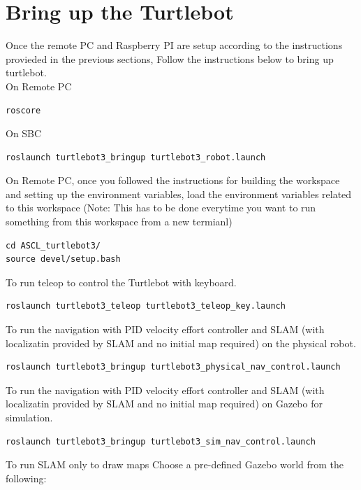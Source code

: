 \documentclass[12]{article}
\begin{document}
\newpage

\section{Bring up the Turtlebot}
Once the remote PC and Raspberry PI are setup according to the instructions provieded in the previous sections, 
Follow the instructions below to bring up turtlebot.  \\
On Remote PC
\begin{lstlisting}[style=bash]
    roscore
\end{lstlisting}
On SBC
\begin{lstlisting}[style=bash]
    roslaunch turtlebot3_bringup turtlebot3_robot.launch
\end{lstlisting}

On Remote PC, once you followed the instructions for building the workspace and setting up the environment variables,  
load the environment variables related to this workspace (Note: This has to be done everytime you want to run something from this workspace from a new termianl)
\begin{lstlisting}[style=bash]
cd ASCL_turtlebot3/
source devel/setup.bash
\end{lstlisting}

To run teleop to control the Turtlebot with keyboard.
\begin{lstlisting}[style=bash]
roslaunch turtlebot3_teleop turtlebot3_teleop_key.launch
\end{lstlisting}

To run the navigation with PID velocity effort controller and SLAM (with localizatin provided by SLAM and no initial map required) on the physical robot. 
\begin{lstlisting}[style=bash]
roslaunch turtlebot3_bringup turtlebot3_physical_nav_control.launch 
\end{lstlisting}

To run the navigation with PID velocity effort controller and SLAM (with localizatin provided by SLAM and no initial map required) on Gazebo for simulation.  
\begin{lstlisting}[style=bash]
roslaunch turtlebot3_bringup turtlebot3_sim_nav_control.launch 
\end{lstlisting}

To run SLAM only to draw maps
Choose a pre-defined Gazebo world from the following:
\end{document}
